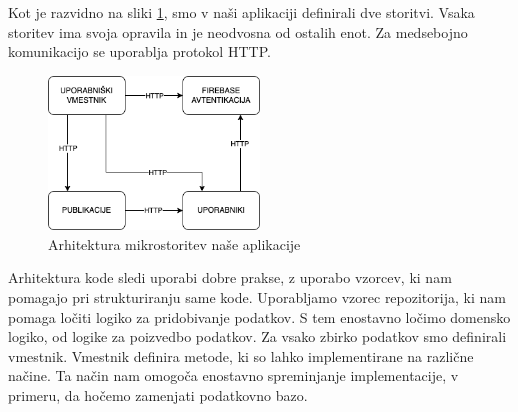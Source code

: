 \documentclass[a4paper, 12pt]{book}
\begin{document}
Kot je razvidno na sliki \ref{app-architecture}, smo v naši aplikaciji definirali dve storitvi. Vsaka storitev ima svoja opravila in je neodvosna od ostalih enot. Za medsebojno komunikacijo se uporablja protokol HTTP.

\begin{figure}[h]
\begin{center}
\includegraphics[width=0.5\textwidth]{slike/architecture.png}
\end{center}
\caption{ Arhitektura mikrostoritev naše aplikacije }
\label{app-architecture}
\end{figure}

Arhitektura kode sledi uporabi dobre prakse, z uporabo vzorcev, ki nam pomagajo pri strukturiranju same kode. Uporabljamo vzorec repozitorija, ki nam pomaga ločiti logiko za pridobivanje podatkov. S tem enostavno ločimo domensko logiko, od logike za poizvedbo podatkov. Za vsako zbirko podatkov smo definirali vmestnik. Vmestnik definira metode, ki so lahko implementirane na različne načine. Ta način nam omogoča enostavno spreminjanje implementacije, v primeru, da hočemo zamenjati podatkovno bazo. 
\end{document}
